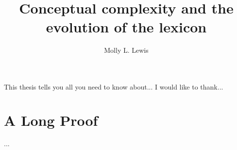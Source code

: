 \documentclass{report}
\begin{document}
\title{Conceptual complexity and the evolution of the lexicon}
\author{Molly L. Lewis}
 
\beforepreface 
{}
This thesis tells you all you need to know about...
I would like to thank...

\afterpreface









\appendix
\chapter{A Long Proof}
...


\end{document}
